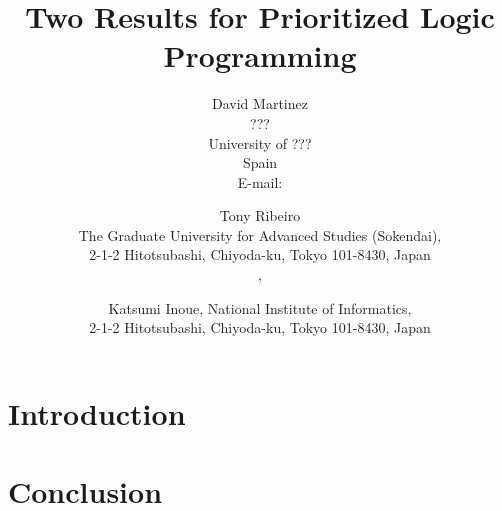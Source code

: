 \documentclass{tlp}
\begin{document}


\long{}


\title{Two Results for Prioritized Logic Programming}

\author[D. Martinez, T. Ribeiro, K. Inoue]
{David Martinez\\
???\\
University of ???\\
Spain    \\
E-mail: \\
\and Tony Ribeiro\\
The Graduate University for Advanced Studies (Sokendai),\\
2-1-2 Hitotsubashi, Chiyoda-ku, Tokyo 101-8430, Japan \\
,\\
\and
Katsumi Inoue,
National Institute of Informatics,\\
2-1-2 Hitotsubashi, Chiyoda-ku, Tokyo 101-8430, Japan\\
}

\pagerange{\pageref{firstpage}--\pageref{lastpage}}
\setcounter{page}{1}

\maketitle

\label{firstpage}
%
\begin{abstract}


	\keywords{}
\end{abstract}

\section{Introduction}


\section{Conclusion}
\label{sec:conclusions}





\appendix
\end{document}
